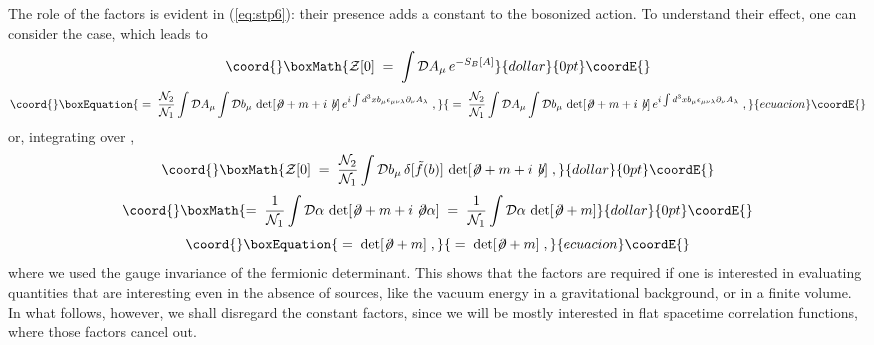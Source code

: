 \documentclass[a4paper,12pt]{article}
\begin{document}
The role of the factors \coordHE{} is evident in
(\ref{eq:stp6}): their presence adds a constant to the bosonized
action. To understand their effect, one can consider the \coordHE{}
case, which leads to
$$\coord{}\boxMath{
{\mathcal Z}[0] \;=\; \int {\mathcal D}A_\mu \, e^{-S_B[A]}
}{dollar}{0pt}\coordE{}$$
\begin{equation}\coord{}\boxEquation{
 \label{eq:s0}
\;=\;  \frac{{\mathcal N}_2}{{\mathcal N}_1}
   \int {\mathcal D}A_\mu  \int {\mathcal D} b_\mu \,
  \det[\not\!\partial + m + i \not \! b ]\,
 e^{i\int d^3 x b_\mu \epsilon_{\mu\nu\lambda} \partial_\nu  A_\lambda} \;,
}{
 \;=\;  \frac{{\mathcal N}_2}{{\mathcal N}_1}
   \int {\mathcal D}A_\mu  \int {\mathcal D} b_\mu \,
  \det[\not\!\partial + m + i \not \! b ]\,
 e^{i\int d^3 x b_\mu \epsilon_{\mu\nu\lambda} \partial_\nu  A_\lambda} \;,
}{ecuacion}\coordE{}\end{equation}
or, integrating over \coordHE{},
$$\coord{}\boxMath{
{\mathcal Z}[0] \;=\; \frac{{\mathcal N}_2}{{\mathcal N}_1} \int
{\mathcal D} b_\mu \,\delta[{\tilde f}(b)] \, \det[\not\!\partial + m
+ i \not \! b ] \;,
}{dollar}{0pt}\coordE{}$$  $$\coord{}\boxMath{
=\; \frac{1}{{\mathcal N}_1} \int {\mathcal D}\alpha \,
\det[\not\!\partial + m + i \not \! \partial \alpha ] \;=\;
\frac{1}{{\mathcal N}_1} \int {\mathcal D}\alpha \,
\det[\not\!\partial + m ]
}{dollar}{0pt}\coordE{}$$
\begin{equation}\coord{}\boxEquation{
 \;=\; \det[\not\!\partial + m ] \;,
}{
 \;=\; \det[\not\!\partial + m ] \;,
}{ecuacion}\coordE{}\end{equation}
where we used the gauge invariance of the fermionic determinant. This
shows that the factors are required if one is interested in evaluating
quantities that are interesting even in the absence of sources, like
the vacuum energy in a gravitational background, or in a finite
volume. In what follows, however, we shall disregard the constant
factors, since we will be mostly interested in flat spacetime
correlation functions, where those factors cancel out.
\end{document}
